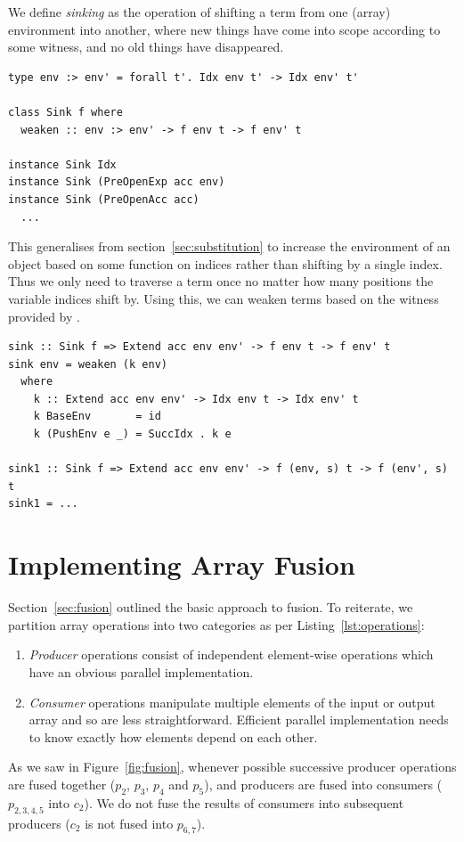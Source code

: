 We define \emph{sinking} as the operation of shifting a term from one (array)
environment into another, where new things have come into scope according to
some witness, and no old things have disappeared.
%
\begin{lstlisting}[style=haskell,
    name=sinking,
    caption={Sinking terms to a larger environment}]
type env :> env' = forall t'. Idx env t' -> Idx env' t'

class Sink f where
  weaken :: env :> env' -> f env t -> f env' t

instance Sink Idx
instance Sink (PreOpenExp acc env)
instance Sink (PreOpenAcc acc)
  ...
\end{lstlisting}
%
This generalises  from section~\ref{sec:substitution} to increase
the environment of an object  based on some function on indices rather
than shifting by a single  index. Thus we only need to
traverse a term once no matter how many positions the variable indices shift by.
Using this, we can weaken terms based on the witness provided by
.
%
\begin{lstlisting}[style=haskell,name=sinking]
sink :: Sink f => Extend acc env env' -> f env t -> f env' t
sink env = weaken (k env)
  where
    k :: Extend acc env env' -> Idx env t -> Idx env' t
    k BaseEnv       = id
    k (PushEnv e _) = SuccIdx . k e

sink1 :: Sink f => Extend acc env env' -> f (env, s) t -> f (env', s) t
sink1 = ...
\end{lstlisting}


\section{Implementing Array Fusion}
\label{sec:implementing_array_fusion}

Section~\ref{sec:fusion} outlined the basic approach to fusion. To reiterate, we
partition array operations into two categories as per
Listing~\ref{lst:operations}:
%
\begin{enumerate}
    \item {}\emph{Producer} operations consist of independent
        element-wise operations which have an obvious parallel implementation.

    \item {}\emph{Consumer} operations manipulate multiple
        elements of the input or output array and so are less straightforward.
        Efficient parallel implementation needs to know exactly how elements
        depend on each other.
\end{enumerate}
%
As we saw in Figure~\ref{fig:fusion}, whenever possible successive producer
operations are fused together ($p_2$, $p_3$, $p_4$ and $p_5$), and producers are
fused into consumers ($p_{ 2,3,4,5 }$ into $ c_2$). We do not fuse the results
of consumers into subsequent producers ($c_2$ is not fused into $p_{ 6,7 }$).

